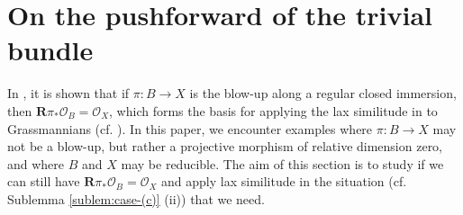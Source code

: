 \documentclass[a4paper]{amsart}
\theoremstyle{plain}
\theoremstyle{definition}
\numberwithin{equation}{section}
\newcommand{\SO}{\mathcal{O}}
\begin{document}
\section{On the pushforward of the trivial bundle}\label{sec:pushforward}
In \cite[Lemme VII.3.5, p.441]{SGA6}, it is shown that if $\pi:B \to X$ is the blow-up along a regular closed immersion, then $\mathbf{R}\pi_*\SO_{B} = \SO_X$, which forms the basis for applying the lax similitude in \cite{balmer2012bases} to Grassmannians \cite{balmer2012witt} (cf. \cite[Proposition 3.15]{balmer2012witt}). In this paper, we encounter examples where $\pi: B\to X$ may not be a blow-up, but rather a projective morphism of relative dimension zero, and where $B$ and $X$ may be reducible. The aim of this section is to study if we can still have $\mathbf{R}\pi_*\SO_{B} = \SO_X$ and apply lax similitude in the situation (cf.  Sublemma \ref{sublem:case-(c)} (ii)) that we need.
\end{document}
